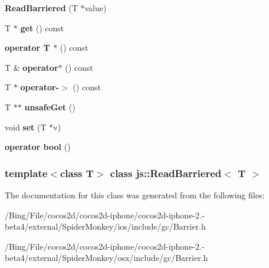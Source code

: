 \begin{DoxyCompactItemize}
\item 
\hypertarget{classjs_1_1_read_barriered_a57873be4b9861d905bbe212231a791c9}{{\bfseries Read\-Barriered} (T $\ast$value)}\label{classjs_1_1_read_barriered_a57873be4b9861d905bbe212231a791c9}

\item 
\hypertarget{classjs_1_1_read_barriered_a6912516519bd91f86f81eab8f7c070d3}{T $\ast$ {\bfseries get} () const }\label{classjs_1_1_read_barriered_a6912516519bd91f86f81eab8f7c070d3}

\item 
\hypertarget{classjs_1_1_read_barriered_af399bc144fead397e1e7757f1ecdb153}{{\bfseries operator T $\ast$} () const }\label{classjs_1_1_read_barriered_af399bc144fead397e1e7757f1ecdb153}

\item 
\hypertarget{classjs_1_1_read_barriered_a0fa4e24e8e27d52887fa5de2f695f5d5}{T \& {\bfseries operator$\ast$} () const }\label{classjs_1_1_read_barriered_a0fa4e24e8e27d52887fa5de2f695f5d5}

\item 
\hypertarget{classjs_1_1_read_barriered_aa23c89e4c8bd143a25eb1fc95e84f147}{T $\ast$ {\bfseries operator-\/$>$} () const }\label{classjs_1_1_read_barriered_aa23c89e4c8bd143a25eb1fc95e84f147}

\item 
\hypertarget{classjs_1_1_read_barriered_ab720165d470827ad56bb900e12e36931}{T $\ast$$\ast$ {\bfseries unsafe\-Get} ()}\label{classjs_1_1_read_barriered_ab720165d470827ad56bb900e12e36931}

\item 
\hypertarget{classjs_1_1_read_barriered_a1bca3b2fef4485b46bcbd4f1ccd3f63c}{void {\bfseries set} (T $\ast$v)}\label{classjs_1_1_read_barriered_a1bca3b2fef4485b46bcbd4f1ccd3f63c}

\item 
\hypertarget{classjs_1_1_read_barriered_a0c3012c6ed1f86ddb63880f3a7ab54a7}{{\bfseries operator bool} ()}\label{classjs_1_1_read_barriered_a0c3012c6ed1f86ddb63880f3a7ab54a7}

\end{DoxyCompactItemize}
\subsubsection*{template$<$class T$>$ class js\-::\-Read\-Barriered$<$ T $>$}



The documentation for this class was generated from the following files\-:\begin{DoxyCompactItemize}
\item 
/\-Bing/\-File/cocos2d/cocos2d-\/iphone/cocos2d-\/iphone-\/2.-\/beta4/external/\-Spider\-Monkey/ios/include/gc/Barrier.\-h\item 
/\-Bing/\-File/cocos2d/cocos2d-\/iphone/cocos2d-\/iphone-\/2.-\/beta4/external/\-Spider\-Monkey/osx/include/gc/Barrier.\-h\end{DoxyCompactItemize}
